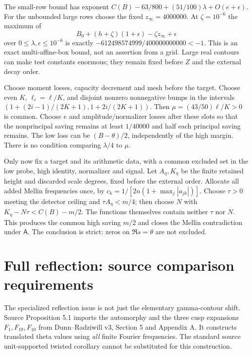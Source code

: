 \documentclass[12pt]{article}
\begin{document}
The small-row bound has exponent
\(C(B)-63/800+(51/100)\lambda+O(e+\epsilon)\).
For the unbounded large rows choose the fixed
\(z_\infty=4000000\).  At \(\zeta=10^{-6}\) the maximum of
\[
 B_0+(h+\zeta)(1+\epsilon)-\zeta z_\infty+\epsilon
\]
over \(0\le\lambda,\epsilon\le10^{-6}\) is exactly
\(-612498574999/400000000000<-1\).
This is an exact multi-affine-box bound, not an assertion from a grid.
Large real contours can make test constants enormous; they remain
fixed before \(Z\) and the external decay order.

Choose moment losses, capacity decrement and mesh before the
target.  Choose even \(K\), \(\ell_i=\ell/K\), and disjoint nonzero
nonnegative bumps in the intervals
\((1+(2i-1)/(2K+1),1+2i/(2K+1))\).
Then \(\mu=(43/50)\ell/K>0\) is common.
Choose \(e\) and amplitude/normalizer losses after these slots so
that the nonprincipal saving remains at least \(1/40000\) and
half each principal saving remains.  The low loss can be
\((B-\theta)/2\), independently of the high margin.
There is no condition comparing \(\lambda/4\) to \(\mu\).

Only now fix a target and its arithmetic data, with a common
excluded set in the low probe, high identity, normalizer and
signal.  Let \(A_\eta,K_\eta\) be the finite retained height and
discarded scale degrees, fixed before the external order.
Allocate all added Mellin frequencies once, by
\(c_k=1/[2n(1+\max_j|a_{jk}|)]\).
Choose \(\tau>0\) meeting the detector ceiling and
\(\tau A_\eta<m/4\); then choose \(N\) with
\(K_\eta-N\tau<C(B)-m/2\).
The functions themselves contain neither \(\tau\) nor \(N\).
This produces the common high saving \(m/2\) and closes the Mellin
contradiction under \(\mathsf A\).  The conclusion is strict:
zeros on \(\Re s=\theta\) are not excluded.

\section{Full reflection: source comparison requirements}
The specialized reflection issue is not just the elementary
gamma-contour shift.  Source Proposition 5.1 imports the automorphy and
the three cusp expansions \(F_1,F_{19},F_{10}\) from
Dunn--Radziwill v3, Section 5 and Appendix A.
It constructs translated theta values using \emph{all} finite
Fourier frequencies.  The standard source unit-supported twisted
corollary cannot be substituted for this construction.
\end{document}
